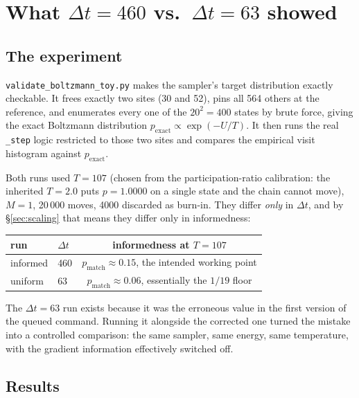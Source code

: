 \documentclass[11pt,a4paper]{article}
\newcommand{\dt}{\Delta t}
\newcommand{\pmatch}{p_{\mathrm{match}}}
\newcommand{\Mass}{M}
\begin{document}
\section{\texorpdfstring{What $\dt=460$ vs.\ $\dt=63$ showed}{What dt=460 vs. dt=63 showed}}
\label{sec:460v63}

\subsection{The experiment}

\texttt{validate\_boltzmann\_toy.py} makes the sampler's target distribution
exactly checkable. It frees exactly two sites (30 and 52), pins all 564 others
at the reference, and enumerates every one of the $20^{2}=400$ states by brute
force, giving the exact Boltzmann distribution $p_{\mathrm{exact}} \propto
\exp(-U/T)$. It then runs the real \texttt{\_step} logic restricted to those
two sites and compares the empirical visit histogram against
$p_{\mathrm{exact}}$.

Both runs used $T=107$ (chosen from the participation-ratio calibration: the
inherited $T=2.0$ puts $p=1.0000$ on a single state and the chain cannot
move), $\Mass=1$, 20\,000 moves, 4000 discarded as burn-in. They differ
\emph{only} in $\dt$, and by \S\ref{sec:scaling} that means they differ only
in informedness:
\begin{center}
\begin{tabular}{llc}
\toprule
run & $\dt$ & informedness at $T=107$ \\
\midrule
informed & 460 & $\pmatch \approx 0.15$, the intended working point \\
uniform  &  63 & $\pmatch \approx 0.06$, essentially the $1/19$ floor \\
\bottomrule
\end{tabular}
\end{center}
The $\dt=63$ run exists because it was the erroneous value in the first
version of the queued command. Running it alongside the corrected one turned
the mistake into a controlled comparison: the same sampler, same energy, same
temperature, with the gradient information effectively switched off.

\subsection{Results}
\end{document}

